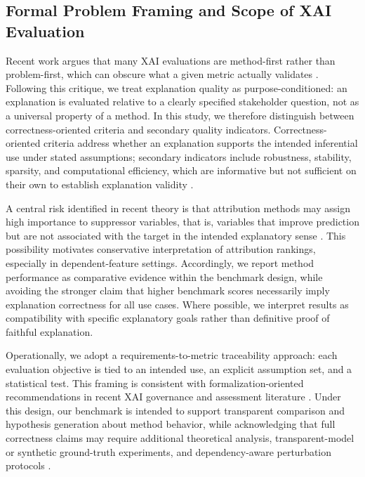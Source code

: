 \documentclass[twoside,11pt]{article}
\begin{document}
\subsection{Formal Problem Framing and Scope of XAI Evaluation}
\label{sec:formal_framing}

Recent work argues that many XAI evaluations are method-first rather than
problem-first, which can obscure what a given metric actually validates
\citep{haufe2026formalization}. Following this critique, we treat explanation
quality as purpose-conditioned: an explanation is evaluated relative to a clearly
specified stakeholder question, not as a universal property of a method. In this
study, we therefore distinguish between correctness-oriented criteria and secondary
quality indicators. Correctness-oriented criteria address whether an explanation
supports the intended inferential use under stated assumptions; secondary indicators
include robustness, stability, sparsity, and computational efficiency, which are
informative but not sufficient on their own to establish explanation validity
\citep{doshivelez2017rigorous,hedstrom2023quantus}.

A central risk identified in recent theory is that attribution methods may assign
high importance to suppressor variables, that is, variables that improve prediction
but are not associated with the target in the intended explanatory sense
\citep{wilming2022scrutinizing,wilming2023theoretical,haufe2026formalization}.
This possibility motivates conservative interpretation of attribution rankings,
especially in dependent-feature settings. Accordingly, we report method performance
as comparative evidence within the benchmark design, while avoiding the stronger
claim that higher benchmark scores necessarily imply explanation correctness for all
use cases. Where possible, we interpret results as compatibility with specific
explanatory goals rather than definitive proof of faithful explanation.

Operationally, we adopt a requirements-to-metric traceability approach: each
evaluation objective is tied to an intended use, an explicit assumption set, and a
statistical test. This framing is consistent with formalization-oriented
recommendations in recent XAI governance and assessment literature
\citep{sokol2020factsheets,dinspec92001,zicari2021zinspection}. Under this design,
our benchmark is intended to support transparent comparison and hypothesis generation
about method behavior, while acknowledging that full correctness claims may require
additional theoretical analysis, transparent-model or synthetic ground-truth
experiments, and dependency-aware perturbation protocols
\citep{haufe2026formalization}.
\end{document}
